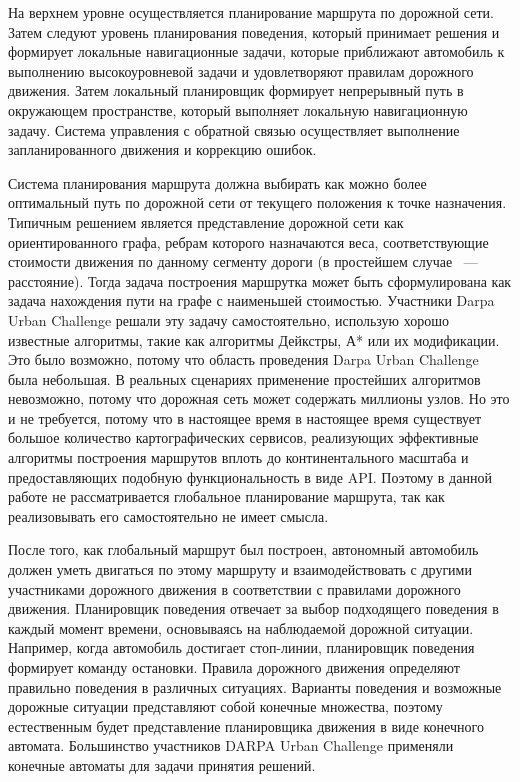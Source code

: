 На верхнем уровне осуществляется планирование маршрута по дорожной сети. Затем следуют уровень планирования поведения,
который принимает решения и формирует локальные навигационные задачи, которые приближают автомобиль к выполнению
высокоуровневой задачи и удовлетворяют правилам дорожного движения. Затем локальный планировщик формирует непрерывный
путь в окружающем пространстве, который выполняет локальную навигационную задачу. Система управления с обратной связью
осуществляет выполнение запланированного
движения и коррекцию ошибок.

Система планирования маршрута должна выбирать как можно более оптимальный путь по дорожной сети от текущего
положения к точке назначения. Типичным решением является представление дорожной сети как ориентированного
графа, ребрам которого назначаются веса, соответствующие стоимости движения по данному сегменту дороги
(в простейшем случае ~--- расстояние). Тогда задача построения маршрутка может быть сформулирована как задача
нахождения пути на графе с наименьшей стоимостью. Участники Darpa Urban Challenge решали эту задачу самостоятельно,
использую хорошо известные алгоритмы, такие как алгоритмы Дейкстры, А* или их модификации. Это было возможно, потому что
область проведения Darpa Urban Challenge была небольшая. В реальных сценариях применение простейших алгоритмов
невозможно, потому что дорожная сеть может содержать миллионы узлов. Но это и не требуется, потому что в настоящее
время в настоящее время существует большое количество картографических сервисов, реализующих эффективные алгоритмы
построения маршрутов вплоть до континентального масштаба и  предоставляющих подобную функциональность в виде API.
Поэтому в данной работе не рассматривается глобальное планирование маршрута, так как реализовывать его самостоятельно
не имеет смысла.

После того, как глобальный маршрут был построен, автономный автомобиль должен уметь двигаться по этому маршруту и
взаимодействовать с другими участниками дорожного движения в соответствии с правилами дорожного движения. Планировщик
поведения отвечает за выбор подходящего поведения в каждый момент времени, основываясь на наблюдаемой дорожной
ситуации. Например, когда автомобиль достигает стоп-линии, планировщик поведения формирует команду остановки.
Правила дорожного движения определяют правильно поведения в различных ситуациях. Варианты поведения и возможные
дорожные ситуации представляют собой конечные множества, поэтому естественным будет представление планировщика
движения в виде конечного автомата. Большинство участников DARPA Urban Challenge применяли конечные автоматы для
задачи принятия решений.


